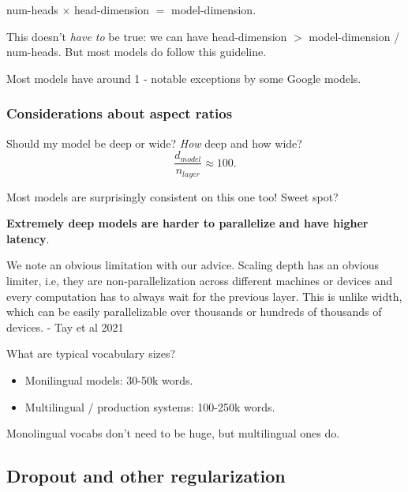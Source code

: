 \documentclass[12pt,twoside]{article}
\begin{document}
\begin{claim}
    num-heads \(\times\) head-dimension \(=\) model-dimension. 
\end{claim}

This doesn't \textit{have to} be true: we can have head-dimension \(>\) model-dimension / num-heads. But most models do follow this guideline. 

\begin{remark}
    Most models have around 1 - notable exceptions by some Google models.
\end{remark}

\subsubsection*{Considerations about aspect ratios}

Should my model be deep or wide? \textit{How} deep and how wide?
\[
    \frac{d_{model}}{n_{layer}} \approx 100.
\]

\begin{question}
    Most models are surprisingly consistent on this one too! Sweet spot?
\end{question}

\textbf{Extremely deep models are harder to parallelize and have higher latency}.

\begin{center}
    We note an obvious limitation with our advice. Scaling depth has an obvious limiter, i.e, they are non-parallelization across different machines or devices and every computation has to always wait for the previous layer. This is unlike width, which can be easily parallelizable over thousands or hundreds of thousands of devices. - Tay et al 2021
\end{center}

\begin{question}
    What are typical vocabulary sizes?
\end{question}

\begin{itemize}
    \item Monilingual models: 30-50k words.
    \item Multilingual / production systems: 100-250k words.
\end{itemize}

Monolingual vocabs don't need to be huge, but multilingual ones do.

\subsection*{Dropout and other regularization}
\end{document}
